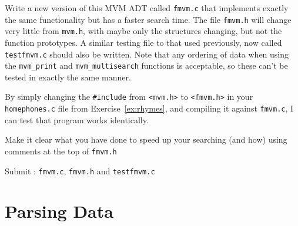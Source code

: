 \begin{exercise}
Write a new version of this MVM ADT called \verb^fmvm.c^ that
implements exactly the same functionality but has a faster search time.
The file \verb^fmvm.h^ will change very little from \verb^mvm.h^, with maybe
only the structures changing, but not the function prototypes.  A similar
testing file to that used previously, now called \verb^testfmvm.c^
should also be written.  Note that any ordering of data when using
the \verb^mvm_print^ and \verb^mvm_multisearch^ functions is acceptable,
so these can't be tested in exactly the same manner.

By simply changing the \verb^#include^ from \verb^<mvm.h>^ to \verb^<fmvm.h>^
in your \verb^homephones.c^ file from Exercise~\ref{ex:rhymes}, and compiling it against
\verb^fmvm.c^, I can test that program works identically.

Make it clear what you have done to speed up your searching (and how)
using comments at the top of \verb^fmvm.h^

Submit : \verb^fmvm.c^, \verb^fmvm.h^ and \verb^testfmvm.c^
\end{exercise}


\newcommand{\bb}{white}
\newcommand{\ff}{black}

\newcommand{\sixel}[6]{%
\begin{tikzpicture}[scale=0.333, every node/.style={scale=0.333}]
\matrix[sixelstyle]
{
|[fill=#1]| \& |[fill=#2]| \\
|[fill=#3]| \& |[fill=#4]| \\
|[fill=#5]| \& |[fill=#6]| \\
};
\end{tikzpicture}%
}

\newcommand{\sepsix}[6]{%
\begin{tikzpicture}[scale=0.333, every node/.style={scale=0.333}]
\matrix[sepsixstyle]
{
|[fill=#1]| \& |[fill=#2]| \\
|[fill=#3]| \& |[fill=#4]| \\
|[fill=#5]| \& |[fill=#6]| \\
};
\end{tikzpicture}%
}

\chapter{Parsing Data}



